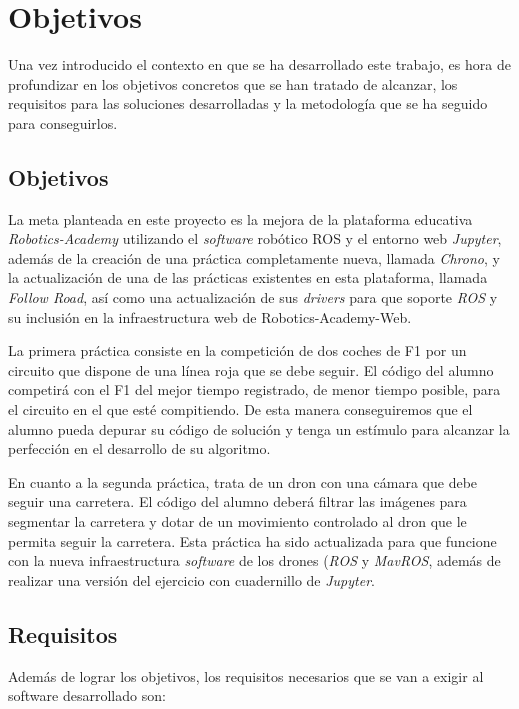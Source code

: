 \chapter{Objetivos}\label{cap.objetivos}
Una vez introducido el contexto en que se ha desarrollado este trabajo, es hora de profundizar en los objetivos concretos que se han tratado de alcanzar, los requisitos para las soluciones desarrolladas y la metodología que se ha seguido para conseguirlos.

\section{Objetivos}
La meta planteada en este proyecto es la mejora de la plataforma educativa \textit{Robotics-Academy} utilizando el \textit{software} robótico ROS y el entorno web \textit{Jupyter}, además de la creación de una práctica completamente nueva, llamada \textit{Chrono}, y la actualización de una de las prácticas existentes en esta plataforma, llamada \textit{Follow Road}, así como una actualización de sus \textit{drivers} para que soporte \textit{ROS} y su inclusión en la infraestructura web de Robotics-Academy-Web.

La primera práctica consiste en la competición de dos coches de F1 por un circuito que dispone de una línea roja que se debe seguir. El código del alumno competirá con el F1 del mejor tiempo registrado, de menor tiempo posible, para el circuito en el que esté compitiendo. De esta manera conseguiremos que el alumno pueda depurar su código de solución y tenga un estímulo para alcanzar la perfección en el desarrollo de su algoritmo.

En cuanto a la segunda práctica, trata de un dron con una cámara que debe seguir una carretera. El código del alumno deberá filtrar las imágenes para segmentar la carretera y dotar de un movimiento controlado al dron que le permita seguir la carretera. Esta práctica ha sido actualizada para que funcione con la nueva infraestructura \textit{software} de los drones (\textit{ROS} y \textit{MavROS}, además de realizar una versión del ejercicio con cuadernillo de \textit{Jupyter}.

\section{Requisitos}
Además de lograr los objetivos, los requisitos necesarios que se van a exigir al software desarrollado son:

